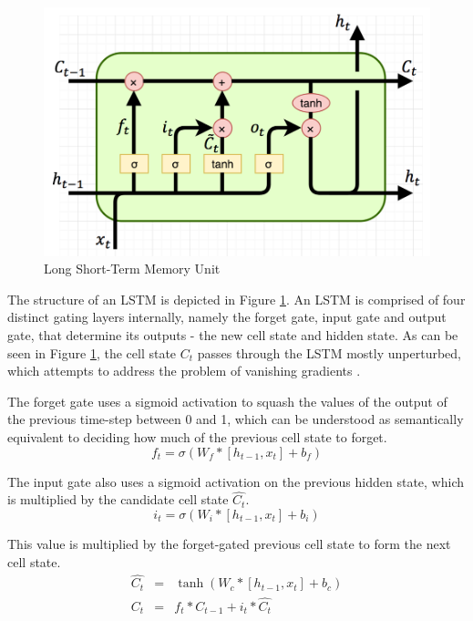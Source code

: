 \begin{figure}[ht]
	\centering
	\includegraphics[width=\textwidth]{images/lstm}
	\caption{\label{fig:lstm} Long Short-Term Memory Unit}
\end{figure}

The structure of an LSTM is depicted in Figure \ref{fig:lstm}. An LSTM is comprised of four distinct gating layers internally, namely the forget gate, input gate and output gate, that determine its outputs - the new cell state and hidden state. As can be seen in Figure \ref{fig:lstm}, the cell state $C_t$ passes through the LSTM mostly unperturbed, which attempts to address the problem of vanishing gradients \citep{hochreiter1999vanishing}.

The forget gate uses a sigmoid activation to squash the values of the output of the previous time-step between 0 and 1, which can be understood as semantically equivalent to deciding how much of the previous cell state to forget.
\begin{equation*}
	f_t = \sigma(W_f*[h_{t-1}, x_t] + b_f)
\end{equation*}

The input gate also uses a sigmoid activation on the previous hidden state, which is multiplied by the candidate cell state $\hat{C_t}$.
\begin{equation*}
	i_t = \sigma(W_i*[h_{t-1}, x_t] + b_i)
\end{equation*}

This value is multiplied by the forget-gated previous cell state to form the next cell state.
\begin{eqnarray*}
	\hat{C_t} &=& \tanh(W_c*[h_{t-1}, x_t] + b_c) \\
	C_t &=& f_t * C_{t-1} + i_t * \hat{C_t}
\end{eqnarray*}

